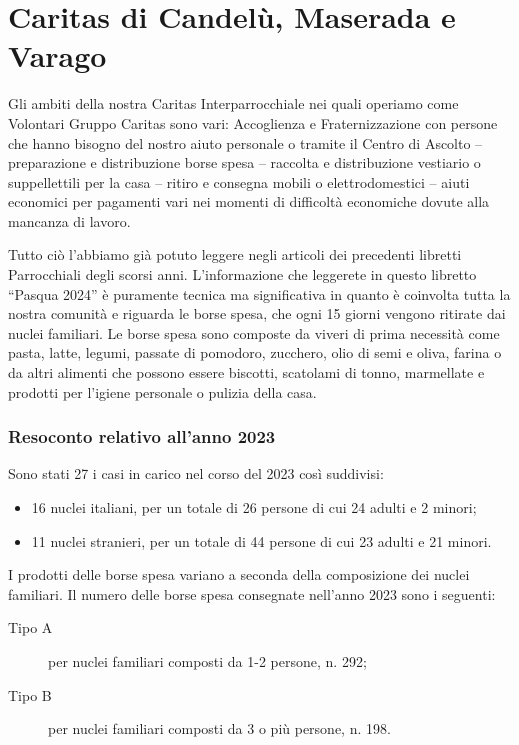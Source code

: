 \section{Caritas di Candelù, Maserada e Varago}

Gli ambiti della nostra Caritas Interparrocchiale nei quali operiamo come Volontari Gruppo Caritas sono vari: Accoglienza e Fraternizzazione con persone che hanno bisogno del nostro aiuto personale o tramite il Centro di Ascolto -- preparazione e distribuzione borse spesa -- raccolta e distribuzione vestiario o suppellettili per la casa -- ritiro e consegna mobili o elettrodomestici -- aiuti economici per pagamenti vari nei momenti di difficoltà economiche dovute alla mancanza di lavoro.

Tutto ciò l’abbiamo già potuto leggere negli articoli dei precedenti libretti Parrocchiali degli scorsi anni.
L’informazione che leggerete in questo libretto “Pasqua 2024” è puramente tecnica ma significativa in quanto è coinvolta tutta la nostra comunità e riguarda le borse spesa, che ogni 15 giorni vengono ritirate dai nuclei familiari. Le borse spesa sono composte da viveri di prima necessità come pasta, latte, legumi, passate di pomodoro, zucchero, olio di semi e oliva, farina o da altri alimenti che possono essere biscotti, scatolami di tonno, marmellate e prodotti per l’igiene personale o pulizia della casa.


\subsubsection{Resoconto relativo all’anno 2023}

Sono stati 27 i casi in carico nel corso del 2023 così suddivisi:
\begin{itemize}
	\item 16 nuclei italiani, per un totale di 26 persone di cui 24 adulti e 2 minori;
	\item 11 nuclei stranieri, per un totale di 44 persone di cui 23 adulti e 21 minori.
\end{itemize}

I prodotti delle borse spesa variano a seconda della composizione dei nuclei familiari. Il numero delle borse spesa consegnate nell’anno 2023 sono i seguenti:
\begin{description}
	\item[Tipo A] per nuclei familiari composti da 1-2 persone, n. 292;
	\item[Tipo B] per nuclei familiari composti da 3 o più persone, n. 198.
\end{description}

